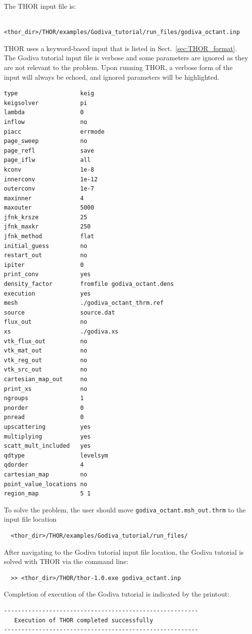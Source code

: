 The THOR input file is:
\begin{verbatim}
   <thor_dir>/THOR/examples/Godiva_tutorial/run_files/godiva_octant.inp
\end{verbatim}
THOR uses a keyword-based input that is listed in Sect.~\ref{sec:THOR_format}.
The Godiva tutorial input file is verbose and some parameters are ignored as they are not relevant to the problem.
Upon running THOR, a verbose form of the input will always be echoed, and ignored parameters will be highlighted.
\begin{verbatim}
type                  keig
keigsolver            pi
lambda                0
inflow                no
piacc                 errmode
page_sweep            no
page_refl             save
page_iflw             all
kconv                 1e-8
innerconv             1e-12
outerconv             1e-7
maxinner              4
maxouter              5000
jfnk_krsze            25
jfnk_maxkr            250
jfnk_method           flat
initial_guess         no
restart_out           no
ipiter                0
print_conv            yes
density_factor        fromfile godiva_octant.dens
execution             yes
mesh                  ./godiva_octant_thrm.ref
source                source.dat
flux_out              no
xs                    ./godiva.xs
vtk_flux_out          no
vtk_mat_out           no
vtk_reg_out           no
vtk_src_out           no
cartesian_map_out     no
print_xs              no
ngroups               1
pnorder               0
pnread                0
upscattering          yes
multiplying           yes
scatt_mult_included   yes
qdtype                levelsym
qdorder               4
cartesian_map         no
point_value_locations no
region_map            5 1
\end{verbatim}

To solve the problem, the user should move \verb"godiva_octant.msh_out.thrm" to the input file location
\begin{verbatim}
  <thor_dir>/THOR/examples/Godiva_tutorial/run_files/
\end{verbatim}
After navigating to the Godiva tutorial input file location, the Godiva tutorial is solved with THOR via the command line:
\begin{verbatim}
  >> <thor_dir>/THOR/thor-1.0.exe godiva_octant.inp
\end{verbatim}

Completion of execution of the Godiva tutorial is indicated by the printout:
\begin{verbatim}
--------------------------------------------------------
   Execution of THOR completed successfully
--------------------------------------------------------
\end{verbatim}

